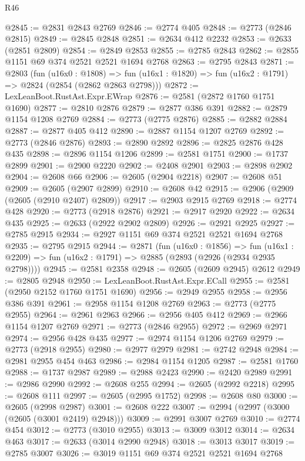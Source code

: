 \begin{lexlean}{R46}
\begin{coremodule}
@2845 := @2831 @2843 @2769
@2846 := @2774 @405
@2848 := @2773 (@2846 @2815)
@2849 := @2845 @2848
@2851 := @2634 @412 @2232
@2853 := @2633 (@2851 @2809)
@2854 := @2849 @2853
@2855 := @2785 @2843
@2862 := @2855 @1151 @69 @374 @2521 @2521 @1694 @2768
@2863 := @2795 @2843
@2871 := @2803
    (fun (u16x0 : @1808) =>
    fun (u16x1 : @1820) => fun (u16x2 : @1791) => @2824 (@2854 (@2862 @2863 @2798)))
@2872 := LexLeanBoot.RustAst.Expr.EWrap
@2876 := @2581 (@2872 @1760 @1751 @1690)
@2877 := @2810 @2876
@2879 := @2877 @386 @391
@2882 := @2879 @1154 @1208 @2769
@2884 := @2773 (@2775 @2876)
@2885 := @2882 @2884
@2887 := @2877 @405 @412
@2890 := @2887 @1154 @1207 @2769
@2892 := @2773 (@2846 @2876)
@2893 := @2890 @2892
@2896 := @2825 @2876 @428 @435
@2898 := @2896 @1154 @1206
@2899 := @2581 @1751
@2900 := @1737 @2899
@2901 := @2900 @2220
@2902 := @2408 @2901
@2903 := @2898 @2902
@2904 := @2608 @66
@2906 := @2605 (@2904 @2218)
@2907 := @2608 @51
@2909 := @2605 (@2907 @2899)
@2910 := @2608 @42
@2915 := @2906 (@2909 (@2605 (@2910 @2407) @2809))
@2917 := @2903 @2915 @2769
@2918 := @2774 @428
@2920 := @2773 (@2918 @2876)
@2921 := @2917 @2920
@2922 := @2634 @435
@2925 := @2633 (@2922 @2902 @2809)
@2926 := @2921 @2925
@2927 := @2785 @2915
@2934 := @2927 @1151 @69 @374 @2521 @2521 @1694 @2768
@2935 := @2795 @2915
@2944 := @2871
    (fun (u16x0 : @1856) =>
    fun (u16x1 : @2209) => fun (u16x2 : @1791) => @2885 (@2893 (@2926 (@2934 @2935 @2798))))
@2945 := @2581 @2358
@2948 := @2605 (@2609 @2945) @2612
@2949 := @2805 @2948
@2950 := LexLeanBoot.RustAst.Expr.ECall
@2955 := @2581 (@2950 @2152 @1760 @1751 @1690)
@2956 := @2949 @2955
@2958 := @2956 @386 @391
@2961 := @2958 @1154 @1208 @2769
@2963 := @2773 (@2775 @2955)
@2964 := @2961 @2963
@2966 := @2956 @405 @412
@2969 := @2966 @1154 @1207 @2769
@2971 := @2773 (@2846 @2955)
@2972 := @2969 @2971
@2974 := @2956 @428 @435
@2977 := @2974 @1154 @1206 @2769
@2979 := @2773 (@2918 @2955)
@2980 := @2977 @2979
@2981 := @2742 @2948
@2984 := @2981 @2955 @454 @463
@2986 := @2984 @1154 @1205
@2987 := @2581 @1760
@2988 := @1737 @2987
@2989 := @2988 @2423
@2990 := @2420 @2989
@2991 := @2986 @2990
@2992 := @2608 @255
@2994 := @2605 (@2992 @2218)
@2995 := @2608 @111
@2997 := @2605 (@2995 @1752)
@2998 := @2608 @80
@3000 := @2605 (@2998 @2987)
@3001 := @2608 @222
@3007 := @2994 (@2997 (@3000 (@2605 (@3001 @2419) @2948)))
@3009 := @2991 @3007 @2769
@3010 := @2774 @454
@3012 := @2773 (@3010 @2955)
@3013 := @3009 @3012
@3014 := @2634 @463
@3017 := @2633 (@3014 @2990 @2948)
@3018 := @3013 @3017
@3019 := @2785 @3007
@3026 := @3019 @1151 @69 @374 @2521 @2521 @1694 @2768

\end{coremodule}
\end{lexlean}
